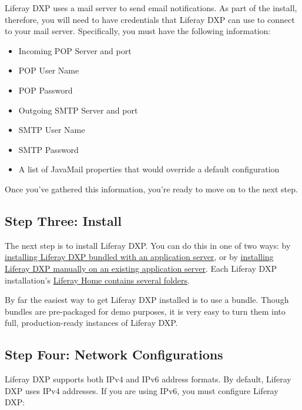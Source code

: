 Liferay DXP uses a mail server to send email notifications. As part of
the install, therefore, you will need to have credentials that Liferay
DXP can use to connect to your mail server. Specifically, you must have
the following information:

\begin{itemize}
\tightlist
\item
  Incoming POP Server and port
\item
  POP User Name
\item
  POP Password
\item
  Outgoing SMTP Server and port
\item
  SMTP User Name
\item
  SMTP Password
\item
  A list of JavaMail properties that would override a default
  configuration
\end{itemize}

Once you've gathered this information, you're ready to move on to the
next step.

\subsection{Step Three: Install}\label{step-three-install}

The next step is to install Liferay DXP. You can do this in one of two
ways: by
\href{/docs/7-0/deploy/-/knowledge_base/d/installing-product}{installing
Liferay DXP bundled with an application server}, or by
\href{/docs/7-0/deploy/-/knowledge_base/d/installing-liferay-manually}{installing
Liferay DXP manually on an existing application server}. Each Liferay
DXP installation's
\href{/docs/7-0/deploy/-/knowledge_base/d/installing-product\#liferay-home}{Liferay
Home contains several folders}.

By far the easiest way to get Liferay DXP installed is to use a bundle.
Though bundles are pre-packaged for demo purposes, it is very easy to
turn them into full, production-ready instances of Liferay DXP.

\subsection{Step Four: Network
Configurations}\label{step-four-network-configurations}

Liferay DXP supports both IPv4 and IPv6 address formats. By default,
Liferay DXP uses IPv4 addresses. If you are using IPv6, you must configure
Liferay DXP:

